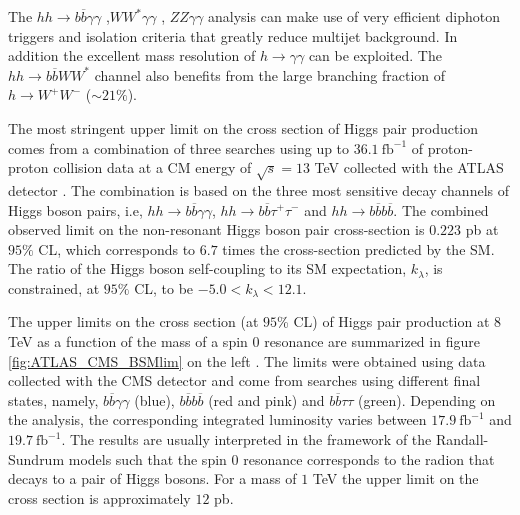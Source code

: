 The $hh\rightarrow b\overline{b}\gamma\gamma$ \cite{hhbbAA_CMS,hhAAbb_ATLAS},$WW^*\gamma\gamma$ \cite{hhATLAS,hhbbll_CMS}, $ZZ\gamma\gamma$ \cite{hhbbll_CMS} analysis can make use of very efficient diphoton triggers and isolation criteria that greatly reduce multijet background. In addition the excellent mass resolution of $h\rightarrow \gamma\gamma$ can be exploited. The $hh\rightarrow b\overline{b}WW^*$ channel also benefits from the large branching fraction of $h\rightarrow W^+W^-$ ($\sim 21 \%$).


The most stringent upper limit on the cross section of Higgs pair production comes from a combination of three searches using up to $36.1~\text{fb}^{-1}$ of proton-proton collision data at a CM energy of $\sqrt{s}=13$ TeV collected with the ATLAS detector \cite{ATLAShhComb}. The combination is based on the three most sensitive decay channels of Higgs boson pairs, i.e, $hh\rightarrow b\overline{b}\gamma\gamma$, $hh\rightarrow b\overline{b}\tau^+\tau^-$ and $hh\rightarrow b\overline{b}b\overline{b}$. The combined observed
limit on the non-resonant Higgs boson pair cross-section is $0.223$ pb at $95\%$ CL,
which corresponds to $6.7$ times the cross-section predicted by the SM. The ratio of the Higgs boson self-coupling to its SM expectation, $k_{\lambda}$, is constrained, at $95\%$ CL, to be $-5.0<k_{\lambda}<12.1$.

The upper limits on the cross section (at $95$\% CL) of Higgs pair production at $8$ TeV as a function of the mass of a spin 0 resonance are summarized in figure \ref{fig:ATLAS_CMS_BSMlim} on the left \cite{hhbbAA_CMS}. The limits were obtained using data collected with the CMS detector and come from searches using different final states, namely, $b\overline{b}\gamma\gamma$ (blue), $b\overline{b}b\overline{b}$ (red and pink) and $b\overline{b}\tau\tau$ (green). Depending on the analysis, the corresponding integrated luminosity varies between $17.9~\text{fb}^{-1}$ and $19.7~\text{fb}^{-1}$. The results are usually interpreted in the framework of the Randall-Sundrum models such that the spin 0 resonance corresponds to the radion that decays to a pair of Higgs bosons. For a mass of $1$ TeV the upper limit on the cross section is approximately $12$ pb.

